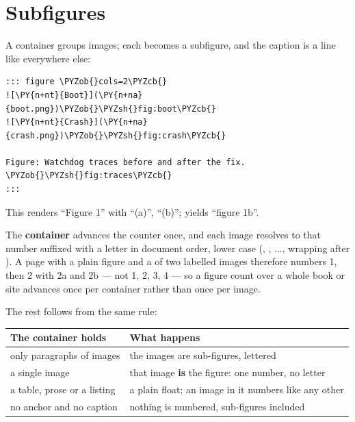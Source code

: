 \documentclass[a4paper,twoside]{article}
\begin{document}
\section{Subfigures}
A  container groups images; each becomes a subfigure, and the
caption is a  line like everywhere else:
\begin{tscode}[lang=md, engine=pygments]
\begin{Verbatim}[commandchars=\\\{\},breaklines, breakanywhere, commandchars=\\\{\}]
::: figure \PYZob{}cols=2\PYZcb{}
![\PY{n+nt}{Boot}](\PY{n+na}{boot.png})\PYZob{}\PYZsh{}fig:boot\PYZcb{}
![\PY{n+nt}{Crash}](\PY{n+na}{crash.png})\PYZob{}\PYZsh{}fig:crash\PYZcb{}

Figure: Watchdog traces before and after the fix. \PYZob{}\PYZsh{}fig:traces\PYZcb{}
:::
\end{Verbatim}
\end{tscode}
This renders ``Figure 1'' with ``(a)'', ``(b)'';  yields ``figure 1b''.
\begin{tscallout}[kind=warning, title={A sub-figure takes no number of its own}]
The \textbf{container} advances the  counter once, and each image resolves
to that number suffixed with a letter in document order, lower case (,
, ..., wrapping after ). A page with a plain figure and a
 of two labelled images therefore numbers 1, then 2 with 2a and
2b --- not 1, 2, 3, 4 --- so a figure count over a whole book or site advances
once per container rather than once per image.
\end{tscallout}
The rest follows from the same rule:
\begin{center}
\begin{tabularx}{\linewidth}{>{\raggedright\arraybackslash}X>{\raggedright\arraybackslash}X}
\toprule
\textbf{The container holds} & \textbf{What happens} \\
\midrule
only paragraphs of images & the images are sub-figures, lettered \\
a single image & that image \textbf{is} the figure: one number, no letter \\
a table, prose or a listing & a plain float; an image in it numbers like any other \\
no anchor and no caption & nothing is numbered, sub-figures included \\
\bottomrule
\end{tabularx}
\end{center}
\end{document}
